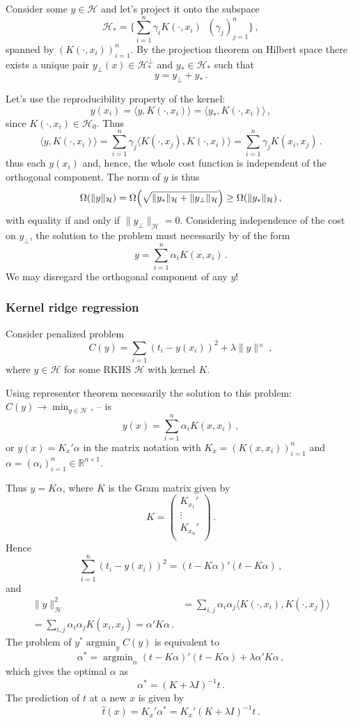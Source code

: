 \documentclass[a4paper]{article}
\newcommand{\Real}{\mathbb{R}}
\newcommand{\Hcal}{\mathcal{H}}
\newcommand{\argmin}{\mathop{\text{argmin}}}
\begin{document}
Consider some $y\in \Hcal$ and let's project it onto the subspace 
\[ \Hcal_* = \{\sum_{i=1}^n \gamma_i K(\cdot, x_i ) \,\:\,(\gamma_j)_{j=1}^n\}\,, \]
spanned by $(K(\cdot, x_i ))_{i=1}^n$.
By the projection theorem on Hilbert space there exists a unique pair 
$y_\perp(x)\in\Hcal_*^\perp$ and $y_* \in \Hcal_*$ such that
\[ y = y_\perp + y_* \,. \]

Let's use the reproducibility property of the kernel:
\[
y(x_i) = \langle y, K(\cdot,x_i) \rangle = \langle y_*, K(\cdot,x_i) \rangle\,,
\]
since $K(\cdot,x_i)\in \Hcal_0$. Thus
\[
\langle y, K(\cdot,x_i) \rangle
= \sum_{i=1}^n \gamma_j \langle K(\cdot, x_j ), K(\cdot,x_i) \rangle
= \sum_{i=1}^n \gamma_j K(x_i, x_j ) \,.
\]
thus each $y(x_i)$ and, hence, the whole cost function is independent of the orthogonal
component. The norm of $y$ is thus
\[
\Omega(\|y\|_\Hcal)
= \Omega\Bigl( \sqrt{\|y_*\|_\Hcal + \|y_\perp\|_\Hcal} \Bigr) 
\geq \Omega(\|y_*\|_\Hcal)\,,
\]
with equality if and only if $\|y_\perp\|_\Hcal = 0$. Considering independence of the
cost on $y_\perp$, the solution to the problem must necessarily by of the form
\[ y = \sum_{i=1}^n \alpha_i K(x, x_i) \,. \]
We may disregard the orthogonal component of any $y$!


\subsubsection{Kernel ridge regression} %
\label{ssub:kernel_ridge_regression}

Consider penalized problem
\[ C(y) = \sum_{i=1} (t_i - y(x_i))^2 + \lambda \|y\|^_\Hcal\,,\]
where $y\in \Hcal$ for some RKHS $\Hcal$ with kernel $K$.

Using representer theorem necessarily the solution to this problem:
$C(y) \to \min_{y\in\Hcal}$, -- is
\[y(x) = \sum_{i=1}^n \alpha_i K(x,x_i)\,, \]
or $y(x) = K_x' \alpha$ in the matrix notation with $K_x = (K(x,x_i))_{i=1}^n$ and 
$\alpha = (\alpha_i)_{i=1}^n \in \Real^{n\times 1}$.

Thus $y = K \alpha$, where $K$ is the Gram matrix given by
\[ K = \begin{pmatrix} K_{x_1}'\\ \vdots\\ K_{x_n}'\\ \end{pmatrix}\,. \]
Hence
\[
\sum_{i=1}^n (t_i - y(x_i))^2 = (t-K\alpha)'(t-K\alpha)\,,
\]
and
\begin{align*}
\|y\|_{\Hcal}^2
	&= \sum_{i,j} \alpha_i \alpha_j \langle K(\cdot,x_i), K(\cdot,x_j)\rangle\\
	= \sum_{i,j} \alpha_i \alpha_j K(x_i,x_j)
	= \alpha' K \alpha\,.
\end{align*}
The problem of $y^* \argmin_y C(y)$ is equivalent to 
\[
\alpha^* = \argmin_\alpha (t-K\alpha)'(t-K\alpha) + \lambda \alpha' K \alpha\,,
\]
which gives the optimal $\alpha$ as
\[ \alpha^* = (K+\lambda I)^{-1} t\,. \]
The prediction of $t$ at a new $x$ is given by
\[ \hat{t}(x) = K_x'\alpha^* = K_x' (K+\lambda I)^{-1} t \,. \]
\end{document}
